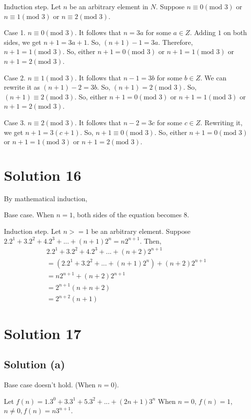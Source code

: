 \documentclass{article}
\begin{document}
Induction step. Let $n$ be an arbitrary element in $N$. Suppose
$n \equiv 0 (\text{mod } 3)$ or $n \equiv 1 (\text{mod } 3)$ or
$n \equiv 2 (\text{mod } 3)$.

Case 1. $n \equiv 0 (\text{mod } 3)$. It follows that $n = 3a$ for
some $a \in Z$. Adding $1$ on both sides, we get $n+1 = 3a + 1$. So,
$(n+1) - 1 = 3a$. Therefore, $n+1 = 1(\text{mod } 3)$. So, either
$n+1 = 0(\text{mod } 3)$ or $n+1 = 1(\text{mod } 3)$ or
$n+1 = 2(\text{mod } 3)$.

Case 2. $n \equiv 1 (\text{mod } 3)$. It follows that $n-1=3b$ for
some $b \in Z$. We can rewrite it as $(n+1) - 2 = 3b$. So,
$(n+1) = 2(\text{mod } 3)$. So, $(n+1) \equiv 2(\text{mod } 3)$. So,
either $n+1 = 0(\text{mod } 3)$ or $n+1 = 1(\text{mod } 3)$ or
$n+1 = 2(\text{mod } 3)$.

Case 3. $n \equiv 2 (\text{mod } 3)$. It follows that $n-2 = 3c$ for
some $c \in Z$. Rewriting it, we get $n+1 = 3(c+1)$. So,
$n+1 \equiv 0 (\text{mod } 3)$. So, either $n+1 = 0(\text{mod } 3)$ or
$n+1 = 1(\text{mod } 3)$ or $n+1 = 2(\text{mod } 3)$.

\section{Solution 16}
By mathematical induction,

Base case. When $n = 1$, both sides of the equation becomes $8$.

Induction step. Let $n >=1$ be an arbitrary element. Suppose $2.2^1 +
3.2^2 + 4.2^3 + ... + (n+1)2^n = n2^{n+1}$. Then,
\begin{align*}
  2.2^1 + 3.2^2 + 4.2^3 + ... + (n+2)2^{n+1} \\
  = (2.2^1 + 3.2^2 + ... + (n+1)2^n) + (n+2)2^{n+1} \\
  = n2^{n + 1} + (n+2)2^{n+1} \\
  = 2^{n+1}(n + n + 2) \\
  = 2^{n+2}(n+1)
\end{align*}

\section{Solution 17}
\subsection{Solution (a)}
Base case doesn't hold. (When $n = 0$).

Let $f(n) = 1.3^0 + 3.3^1 + 5.3^2 + ... + (2n+1)3^n$
When $n = 0$, $f(n) = 1$,
$n \neq 0, f(n) = n3^{n + 1}$.
\end{document}
